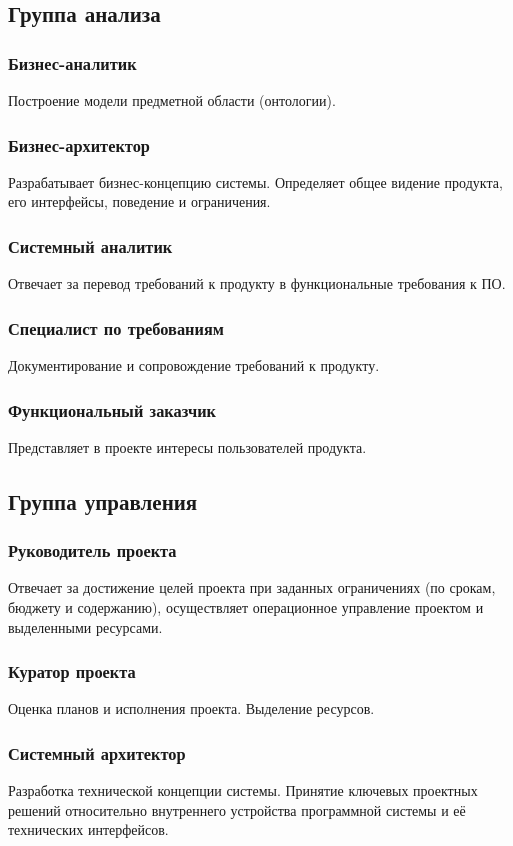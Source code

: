 \documentclass{../industrial-development}
\begin{document}
\subsection{Группа анализа}

\begin{frame} \frametitle{Бизнес-аналитик}
Построение модели предметной области (онтологии).
\end{frame}

\begin{frame} \frametitle{Бизнес-архитектор}
Разрабатывает бизнес-концепцию системы. Определяет общее видение продукта, его интерфейсы, поведение и ограничения.
\end{frame}

\begin{frame} \frametitle{Системный аналитик}
Отвечает за перевод требований к продукту в функциональные требования к ПО.
\end{frame}

\begin{frame} \frametitle{Специалист по требованиям}
Документирование и сопровождение требований к продукту.
\end{frame}
 
\begin{frame} \frametitle{Функциональный заказчик}
Представляет в проекте интересы пользователей продукта.
\end{frame}
 
\subsection{Группа управления}
\begin{frame} \frametitle{Руководитель проекта}
Отвечает за достижение целей проекта при заданных ограничениях (по срокам, бюджету и содержанию), осуществляет операционное управление проектом и выделенными ресурсами.
\end{frame}

\begin{frame} \frametitle{Куратор проекта}
Оценка планов и исполнения проекта. Выделение ресурсов.
\end{frame}

\begin{frame} \frametitle{Системный архитектор}
Разработка технической концепции системы. Принятие ключевых проектных решений относительно внутреннего устройства программной системы и её технических интерфейсов.
\end{frame}
\end{document}
